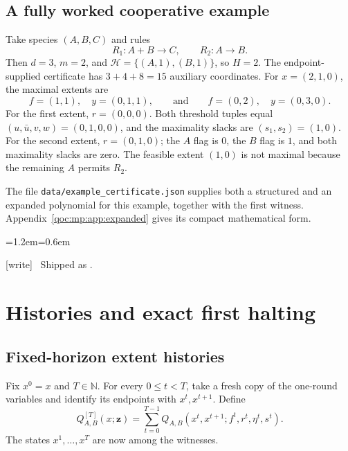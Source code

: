 \documentclass[11pt,letterpaper]{article}
\theoremstyle{definition}
\theoremstyle{remark}
\newcommand{\N}{\mathbb N}
\newcommand{\cH}{\mathcal H}
\newcommand{\wtag}{\textup{[write]}}
\newenvironment{writenote}{\par\smallskip\begin{list}{}{\leftmargin=1.2em\rightmargin=0.6em}\item[]\small\wtag\ }{\end{list}\smallskip}
\begin{document}
\subsection{A fully worked cooperative example}\label{qoc:mp:sec:example}
Take species $(A,B,C)$ and rules
\[
 R_1:A+B\longrightarrow C,\qquad R_2:A\longrightarrow B.
\]
Then $d=3$, $m=2$, and
$\cH=\{(A,1),(B,1)\}$, so $H=2$. The endpoint-supplied certificate has
$3+4+8=15$ auxiliary coordinates. For $x=(2,1,0)$, the maximal extents are
\[
 f=(1,1),\quad y=(0,1,1),
 \qquad\text{and}\qquad
 f=(0,2),\quad y=(0,3,0).
\]
For the first extent, $r=(0,0,0)$. Both threshold tuples equal
$(u,\bar u,v,w)=(0,1,0,0)$, and the maximality slacks are $(s_1,s_2)=(1,0)$.
For the second extent, $r=(0,1,0)$; the $A$ flag is $0$, the $B$ flag is
$1$, and both maximality slacks are zero. The feasible extent $(1,0)$ is
not maximal because the remaining $A$ permits $R_2$.

The file \texttt{data/example\_certificate.json} supplies both a structured
and an expanded polynomial for this example, together with the first
witness. Appendix~\ref{qoc:mp:app:expanded} gives its compact mathematical form.

\begin{writenote}
Shipped as .
\end{writenote}

\section{Histories and exact first halting}\label{qoc:mp:sec:firsthalt}
\subsection{Fixed-horizon extent histories}
Fix $x^0=x$ and $T\in\N$. For every $0\le t<T$, take a fresh copy of the
one-round variables and identify its endpoints with $x^t,x^{t+1}$. Define
\begin{equation}\label{qoc:mp:eq:tracepoly}
 Q^{[T]}_{A,B}(x;\mathbf z)
 =\sum_{t=0}^{T-1}
 Q_{A,B}(x^t,x^{t+1};f^t,r^t,\eta^t,s^t).
\end{equation}
The states $x^1,\ldots,x^T$ are now among the witnesses.
\end{document}
